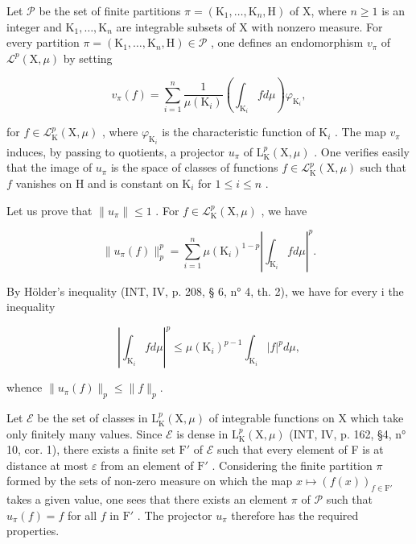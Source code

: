 Let \(\mathcal{P}\) be the set of finite partitions \(\pi = (\mathrm{K}_1, \ldots, \mathrm{K}_n, \mathrm{H})\) of X, where \(n \geqslant 1\) is an integer and \(\mathrm{K}_1, \ldots, \mathrm{K}_n\) are integrable subsets of X with nonzero measure. For every partition \(\pi = (\mathrm{K}_1, \ldots, \mathrm{K}_n, \mathrm{H}) \in \mathcal{P}\) , one defines an endomorphism \(v_\pi\) of \(\mathcal{L}^p(\mathrm{X}, \mu)\) by setting

\[
v _ {\pi} (f) = \sum_ {i = 1} ^ {n} \frac {1}{\mu (\mathrm{K} _ {i})} \left(\int_ {\mathrm{K} _ {i}} f d \mu\right) \varphi_ {\mathrm{K} _ {i}},
\]

for \(f \in \mathcal{L}_{\mathrm{K}}^{p}(\mathrm{X}, \mu)\) , where \(\varphi_{\mathrm{K}_i}\) is the characteristic function of \(\mathrm{K}_i\) . The map \(v_\pi\) induces, by passing to quotients, a projector \(u_\pi\) of \(\mathrm{L}_{\mathrm{K}}^{p}(\mathrm{X}, \mu)\) . One verifies easily that the image of \(u_\pi\) is the space of classes of functions \(f \in \mathcal{L}_{\mathrm{K}}^{p}(\mathrm{X}, \mu)\) such that \(f\) vanishes on H and is constant on \(\mathrm{K}_i\) for \(1 \leqslant i \leqslant n\) .

Let us prove that \(\| u_{\pi}\| \leqslant 1\) . For \(f\in \mathcal{L}_{\mathrm{K}}^{p}(\mathrm{X},\mu)\) , we have

\[
\| u _ {\pi} (f) \| _ {p} ^ {p} = \sum_ {i = 1} ^ {n} \mu (\mathrm{K} _ {i}) ^ {1 - p} \left| \int_ {\mathrm{K} _ {i}} f d \mu \right| ^ {p}.
\]

By Hölder's inequality (INT, IV, p. 208, § 6, n° 4, th. 2), we have for every i the inequality

\[
\left| \int_ {\mathrm{K} _ {i}} f d \mu \right| ^ {p} \leqslant \mu (\mathrm{K} _ {i}) ^ {p - 1} \int_ {\mathrm{K} _ {i}} | f | ^ {p} d \mu ,
\]

whence \(\| u_{\pi}(f)\| _p\leqslant \| f\| _p.\)

Let \(\mathcal{E}\) be the set of classes in \(\mathrm{L}_{\mathrm{K}}^{p}(\mathrm{X},\mu)\) of integrable functions on X which take only finitely many values. Since \(\mathcal{E}\) is dense in \(\mathrm{L}_{\mathrm{K}}^{p}(\mathrm{X},\mu)\) (INT, IV, p. 162, §4, n° 10, cor. 1), there exists a finite set \(\mathrm{F}'\) of \(\mathcal{E}\) such that every element of F is at distance at most \(\varepsilon\) from an element of \(\mathrm{F}'\) . Considering the finite partition \(\pi\) formed by the sets of non-zero measure on which the map \(x\mapsto (f(x))_{f\in \mathrm{F}'}\) takes a given value, one sees that there exists an element \(\pi\) of \(\mathcal{P}\) such that \(u_{\pi}(f) = f\) for all \(f\) in \(\mathrm{F}'\) . The projector \(u_{\pi}\) therefore has the required properties.

